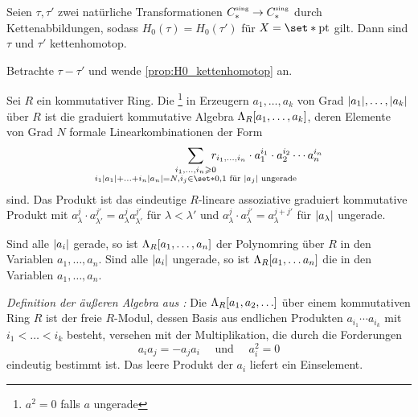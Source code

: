 \begin{korollar}[label=korr:H0_kettenhomotop,{name=[Kettenhomotopie von natürlichen Transformationen]}]
	Seien $\tau, \tau'$ zwei natürliche Transformationen $C_*^\sing \to C_*^\sing$ durch Kettenabbildungen, sodass $H_0(\tau) = H_0(\tau')$ für $X= \set*{\pt}$ gilt. 
	Dann sind $\tau$ und $\tau'$ kettenhomotop.
\end{korollar}
\begin{beweis}
	Betrachte $\tau-\tau'$ und wende \autoref{prop:H0_kettenhomotop} an.
\end{beweis}

\begin{definition}[{name=[Äußere Algebra]}]
	Sei $R$ ein kommutativer Ring. Die \footnote{$a^2=0$ falls $a$ ungerade} in Erzeugern $a_1, \ldots, a_k$ von Grad $\abs*{a_1}, \ldots , \abs*{a_k}$ über $R$ ist die 
	graduiert kommutative Algebra $\Lambda_R \benbrace*{a_1,\ldots,a_k}$, deren Elemente von Grad $N$ formale Linearkombinationen der Form 
	\[
		\smashoperator[r]{\sum_{\substack{i_1, \ldots ,i_n \ge 0 \\ i_1 \abs*{a_1} + \ldots + i_n \abs*{a_n} = N , i_j \in \set*{0,1} \text{ für } \abs*{a_j} \text{ ungerade}}}} 
		\enspace r_{i_1, \ldots ,i_n} \cdot a_1^{i_1} \cdot a_2^{i_2} \cdots a_n^{i_n}
	\]
	sind.
	Das Produkt ist das eindeutige $R$-lineare assoziative graduiert kommutative Produkt mit $a_\lambda^j \cdot a_{\lambda'}^{j'} = a_\lambda^j a_{\lambda'}^{j'}$ für 
	$\lambda< \lambda'$ und $a_\lambda^j \cdot a_\lambda^{j'} = a_\lambda^{j+j'}$ für $\abs*{a_\lambda}$ ungerade.
\end{definition}

\begin{beispiel}[{name=[Polynomring und äußere Algebra]}]
	Sind alle $\abs*{a_i}$ gerade, so ist $\Lambda_R \benbrace*{a_1,\ldots,a_n}$ der Polynomring über $R$ in den Variablen $a_1, \ldots ,a_n$.
	Sind alle $\abs*{a_i}$ ungerade, so ist $\Lambda_R \benbrace*{a_1, \ldots a_n}$ die  in den Variablen $a_1, \ldots , a_n$.
	
	\emph{Definition der äußeren Algebra aus \cite[Ex. 3.15]{Hatcher}:}
	Die  $\Lambda_R \benbrace*{a_1,a_2,\ldots }$ über einem kommutativen Ring $R$ ist der freie $R$-Modul, dessen Basis aus endlichen Produkten $a_{i_1} \cdots a_{i_k}$ mit $i_1 < \ldots < i_k$ besteht, versehen mit der Multiplikation, die durch die Forderungen 
	\[
		a_i a_j= -a_j a_i \quad \text{ und } \quad  a_i^2=0
	\]
	eindeutig bestimmt ist. 
	Das leere Produkt der $a_i$ liefert ein Einselement.
\end{beispiel}

